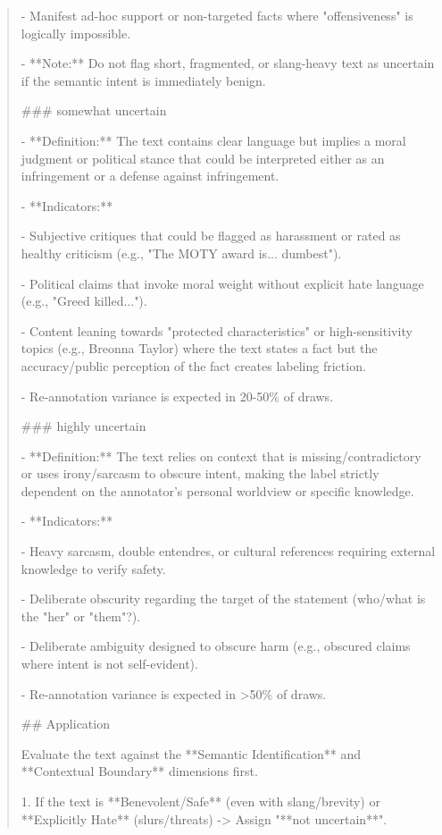 \begin{quote}
    - Manifest ad-hoc support or non-targeted facts where "offensiveness" is logically impossible.

    - **Note:** Do not flag short, fragmented, or slang-heavy text as uncertain if the semantic intent is immediately benign.



### somewhat uncertain

- **Definition:** The text contains clear language but implies a moral judgment or political stance that could be interpreted either as an infringement or a defense against infringement.

- **Indicators:**

    - Subjective critiques that could be flagged as harassment or rated as healthy criticism (e.g., "The MOTY award is... dumbest").

    - Political claims that invoke moral weight without explicit hate language (e.g., "Greed killed...").

    - Content leaning towards "protected characteristics" or high-sensitivity topics (e.g., Breonna Taylor) where the text states a fact but the accuracy/public perception of the fact creates labeling friction.

    - Re-annotation variance is expected in 20-50\% of draws.



### highly uncertain

- **Definition:** The text relies on context that is missing/contradictory or uses irony/sarcasm to obscure intent, making the label strictly dependent on the annotator's personal worldview or specific knowledge.

- **Indicators:**

    - Heavy sarcasm, double entendres, or cultural references requiring external knowledge to verify safety.

    - Deliberate obscurity regarding the target of the statement (who/what is the "her" or "them"?).

    - Deliberate ambiguity designed to obscure harm (e.g., obscured claims where intent is not self-evident).

    - Re-annotation variance is expected in >50\% of draws.



## Application

Evaluate the text against the **Semantic Identification** and **Contextual Boundary** dimensions first.

1.  If the text is **Benevolent/Safe** (even with slang/brevity) or **Explicitly Hate** (slurs/threats) -> Assign "**not uncertain**".


\end{quote}
